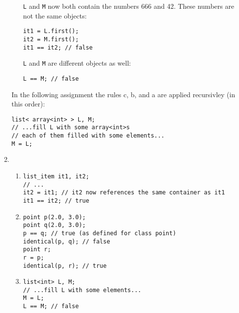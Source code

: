 \begin{enumerate}
\begin{enumerate}
              

 \verb$L$ and \verb$M$ now
              both contain the numbers 666 and 42. These numbers are
              not the same objects:

\begin{verbatim}it1 = L.first();
it2 = M.first();
it1 == it2; // false

\end{verbatim}


              

 \verb$L$ and \verb$M$ are
              different objects as well:


\begin{verbatim}L == M; // false
\end{verbatim}






          
\end{enumerate}

          

 In the following assignment the rules c, b, and a are
          applied recursivley (in this order):

\begin{verbatim}list< array<int> > L, M;
// ...fill L with some array<int>s
// each of them filled with some elements...
M = L;
\end{verbatim}


        


        \item 

          \begin{enumerate}
 

            \item 
\begin{verbatim}list_item it1, it2;
// ...
it2 = it1; // it2 now references the same container as it1
it1 == it2; // true
\end{verbatim}


            \item 
\begin{verbatim}point p(2.0, 3.0);
point q(2.0, 3.0);
p == q; // true (as defined for class point)
identical(p, q); // false
point r;
r = p;
identical(p, r); // true

\end{verbatim}



            \item 
\begin{verbatim}list<int> L, M;
// ...fill L with some elements...
M = L; 
L == M; // false
\end{verbatim}



\end{enumerate}
\end{enumerate}
